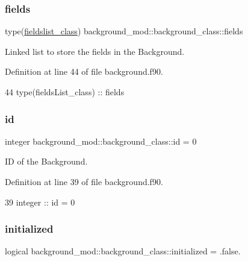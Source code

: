 \subsubsection{\texorpdfstring{fields}{fields}}
{\footnotesize\ttfamily type(\mbox{\hyperlink{structbackground__mod_1_1fieldslist__class}{fieldslist\+\_\+class}}) background\+\_\+mod\+::background\+\_\+class\+::fields\hspace{0.3cm}{\ttfamily [private]}}



Linked list to store the fields in the Background. 



Definition at line 44 of file background.\+f90.


\begin{DoxyCode}
44         \textcolor{keywordtype}{type}(fieldsList\_class) :: fields
\end{DoxyCode}
\mbox{\label{structbackground__mod_1_1background__class_a1b3eabdda94ffdb97b6bb0db385edfd8}} 
\subsubsection{\texorpdfstring{id}{id}}
{\footnotesize\ttfamily integer background\+\_\+mod\+::background\+\_\+class\+::id = 0\hspace{0.3cm}{\ttfamily [private]}}



ID of the Background. 



Definition at line 39 of file background.\+f90.


\begin{DoxyCode}
39         \textcolor{keywordtype}{integer} :: id = 0
\end{DoxyCode}
\mbox{\label{structbackground__mod_1_1background__class_aeb3f1a195165888bc63066aed03d651b}} 
\subsubsection{\texorpdfstring{initialized}{initialized}}
{\footnotesize\ttfamily logical background\+\_\+mod\+::background\+\_\+class\+::initialized = .false.\hspace{0.3cm}{\ttfamily [private]}}



